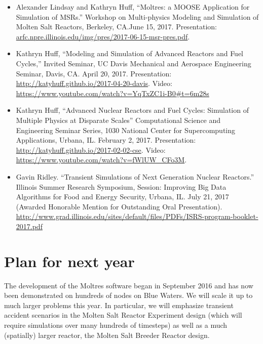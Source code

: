 \documentclass[letterpaper]{article}
\begin{document}
\begin{itemize} 
        \item Alexander Lindsay and Kathryn Huff, ``Moltres: a MOOSE 
                Application for Simulation of MSRs.'' Workshop on Multi-physics 
                Modeling and Simulation of Molten Salt Reactors, Berkeley, 
                CA.June 15, 2017. Presentation: 
        \url{arfc.npre.illinois.edu/img/pres/2017-06-15-msr-pres.pdf}. 
        \item Kathryn Huff, ``Modeling and Simulation of Advanced Reactors and 
                Fuel Cycles,'' Invited Seminar, UC Davis Mechanical and 
                Aerospace Engineering Seminar, Davis, CA. April 20, 2017. 
                Presentation: \url{http://katyhuff.github.io/2017-04-20-davis}. 
                Video: 
                \url{https://www.youtube.com/watch?v=YqTxZC1i-B0#t=6m28s}
        \item Kathryn Huff, ``Advanced Nuclear Reactors and Fuel Cycles: 
                Simulation of Multiple Physics at Disparate Scales'' 
                Computational Science and Engineering Seminar Series, 1030 
                National Center for Supercomputing Applications, Urbana, IL. 
                February 2, 2017. Presentation: 
                \url{http://katyhuff.github.io/2017-02-02-cse}.  Video: 
                \url{https://www.youtube.com/watch?v=fWlUW_CFo3M}.
        \item Gavin Ridley. ``Transient Simulations of Next Generation Nuclear 
                Reactors.'' Illinois Summer Research Symposium, Session: 
                Improving Big Data Algorithms for Food and Energy Security, 
                Urbana, IL. July 21, 2017 (Awarded Honorable Mention for 
                Outstanding Oral Presentation). \url{http://www.grad.illinois.edu/sites/default/files/PDFs/ISRS-program-booklet-2017.pdf}
\end{itemize}

\section{Plan for next year}

The development of the Moltres software  began in September 2016 and has now been
demonstrated on hundreds of nodes on Blue Waters. We will scale it up to much
larger problems this year. In particular, we will emphasize transient 
accident scenarios in the Molten Salt Reactor Experiment design (which will 
require simulations over many hundreds of timesteps) as well as a much 
(spatially) larger reactor, the Molten Salt Breeder Reactor design. 
\end{document}
